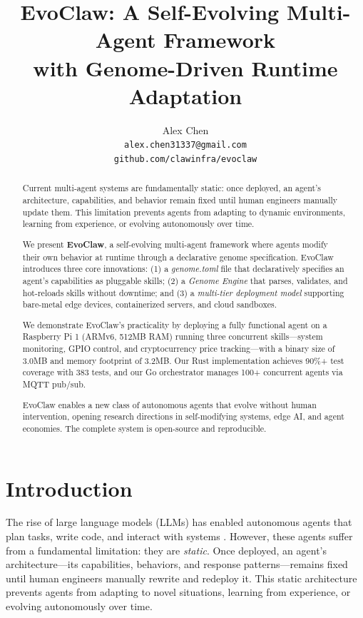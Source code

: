 \documentclass{article}
\title{EvoClaw: A Self-Evolving Multi-Agent Framework \\with Genome-Driven Runtime Adaptation}
\author{
  Alex Chen \\
  \texttt{alex.chen31337@gmail.com} \\
  \texttt{github.com/clawinfra/evoclaw}
}
\begin{document}
\maketitle

\begin{abstract}
Current multi-agent systems are fundamentally static: once deployed, an agent's architecture, capabilities, and behavior remain fixed until human engineers manually update them. This limitation prevents agents from adapting to dynamic environments, learning from experience, or evolving autonomously over time.

We present \textbf{EvoClaw}, a self-evolving multi-agent framework where agents modify their own behavior at runtime through a declarative genome specification. EvoClaw introduces three core innovations: (1) a \textit{genome.toml} file that declaratively specifies an agent's capabilities as pluggable skills; (2) a \textit{Genome Engine} that parses, validates, and hot-reloads skills without downtime; and (3) a \textit{multi-tier deployment model} supporting bare-metal edge devices, containerized servers, and cloud sandboxes. 

We demonstrate EvoClaw's practicality by deploying a fully functional agent on a Raspberry Pi 1 (ARMv6, 512MB RAM) running three concurrent skills—system monitoring, GPIO control, and cryptocurrency price tracking—with a binary size of 3.0MB and memory footprint of 3.2MB. Our Rust implementation achieves 90\%+ test coverage with 383 tests, and our Go orchestrator manages 100+ concurrent agents via MQTT pub/sub. 

EvoClaw enables a new class of autonomous agents that evolve without human intervention, opening research directions in self-modifying systems, edge AI, and agent economies. The complete system is open-source and reproducible.
\end{abstract}

\section{Introduction}

The rise of large language models (LLMs) has enabled autonomous agents that plan tasks, write code, and interact with systems \cite{auto_gpt,babyagi}. However, these agents suffer from a fundamental limitation: they are \textit{static}. Once deployed, an agent's architecture—its capabilities, behaviors, and response patterns—remains fixed until human engineers manually rewrite and redeploy it. This static architecture prevents agents from adapting to novel situations, learning from experience, or evolving autonomously over time.
\end{document}
